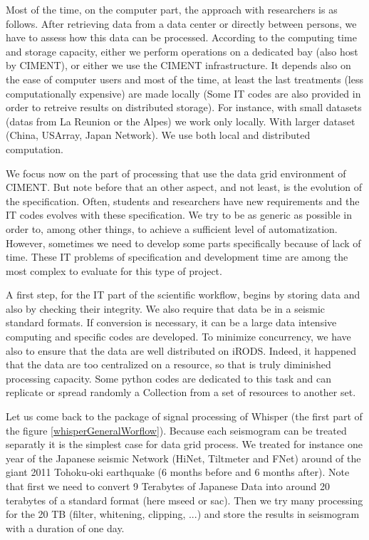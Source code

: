 \documentclass[a4paper, 10pt]{article}
\begin{document}
\begin{multicols}{2}
Most of the time, on the computer part, the approach with researchers is as follows.
After retrieving data from a data center or directly between persons, we have to assess how this data can be processed.
According to the computing time and storage capacity, either we perform operations on a dedicated bay (also host by CIMENT), or either we use the CIMENT infrastructure.
It depends also on the ease of computer users and most of the time, at least the last treatments (less computationally expensive) are made locally
(Some IT codes are also provided in order to retreive results on distributed storage).
For instance, with small datasets (datas from La Reunion or the Alpes) we work only locally. With larger dataset (China, USArray, Japan Network).
We use both local and distributed computation.



We focus now on the part of processing that use the data grid environment of CIMENT.
But note before that an other aspect, and not least, is the evolution of the specification. 
Often, students and researchers have new requirements and the IT codes evolves with these specification.
We try to be as generic as possible in order to, among other things, to achieve a sufficient level of automatization.
However, sometimes we need to develop some parts specifically because of lack of time.
These IT problems of specification and development time are among the most complex to evaluate for this type of project.


A first step, for the IT part of the scientific workflow, begins by storing data and also by checking their integrity.
We also require that data be in a seismic standard formats.
If conversion is necessary, it can be a large data intensive computing and specific codes are developed.
To minimize concurrency, we have also to ensure that the data are well distributed on iRODS. 
Indeed, it happened that the data are too centralized on a resource, so that is truly diminished processing capacity.
Some python codes are dedicated to this task and can replicate or spread randomly a Collection from a set of resources to another set.


Let us come back to the package of signal processing of Whisper (the first part of the figure \ref{whisperGeneralWorflow}).
Because each seismogram can be treated separatly it is the simplest case for data grid process. We treated for instance one year of the
Japanese seismic Network (HiNet, Tiltmeter and FNet) around of the giant 2011 Tohoku-oki earthquake (6 months before and 6 months after).
Note that first we need to convert 9 Terabytes of Japanese Data into around 20 terabytes of a standard format (here mseed or sac).
Then we try many processing for the 20 TB (filter, whitening, clipping, ...) and store the results in seismogram with a duration of one day.



\end{multicols}
\end{document}
